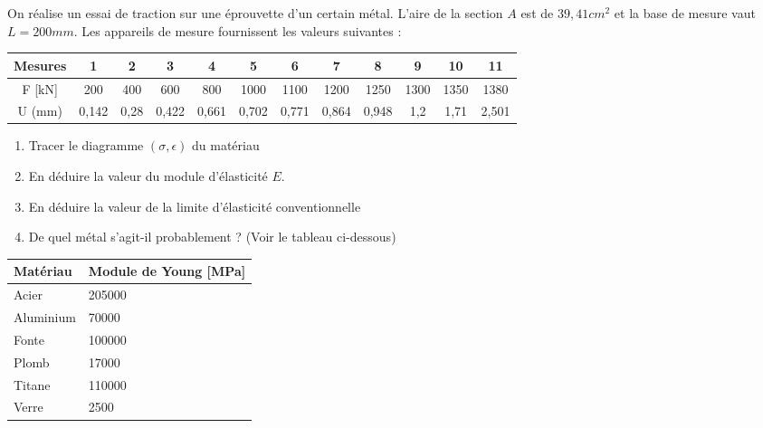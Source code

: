 \documentclass[lecture.tex]{subfiles}
\begin{document}
\exercice{}

On réalise un essai de traction sur une éprouvette d’un certain métal. L’aire de la section $A$ est de $39,41 cm^2$ et la base de mesure vaut $L=200mm$. Les appareils de mesure fournissent les valeurs suivantes :

\begin{center}
 \begin{tabular}{|c|c|c|c|c|c|c|c|c|c|c|c|}
 \hline
 Mesures & 1 & 2 & 3 & 4 & 5 & 6 & 7 & 8 & 9 & 10 & 11 \\
 \hline
 F [kN] & 200 & 400 & 600 & 800 & 1000 & 1100 & 1200 & 1250 & 1300 & 1350 & 1380 \\
 \hline
 U (mm) & 0,142 & 0,28 & 0,422 & 0,661 & 0,702 & 0,771 & 0,864 & 0,948 & 1,2 & 1,71 & 2,501 \\
 \hline
\end{tabular}
\end{center}

\begin{enumerate}
  \item Tracer le diagramme $(\sigma,\epsilon)$ du matériau
  \item En déduire la valeur du module d’élasticité $E$.
  \item En déduire la valeur de la limite d’élasticité conventionnelle
  \item De quel métal s’agit-il probablement ? (Voir le tableau ci-dessous)
\end{enumerate}

\begin{center}
\begin{tabular}{|l|l|}
  \hline
  Matériau & Module de Young [MPa] \\
  \hline
  Acier & 205000 \\
  \hline
  Aluminium & 70000 \\
  \hline
  Fonte & 100000 \\
  \hline
  Plomb & 17000 \\
  \hline
  Titane & 110000 \\
  \hline
  Verre & 2500 \\
  \hline
\end{tabular}
\end{center}


\finexercice
\end{document}
